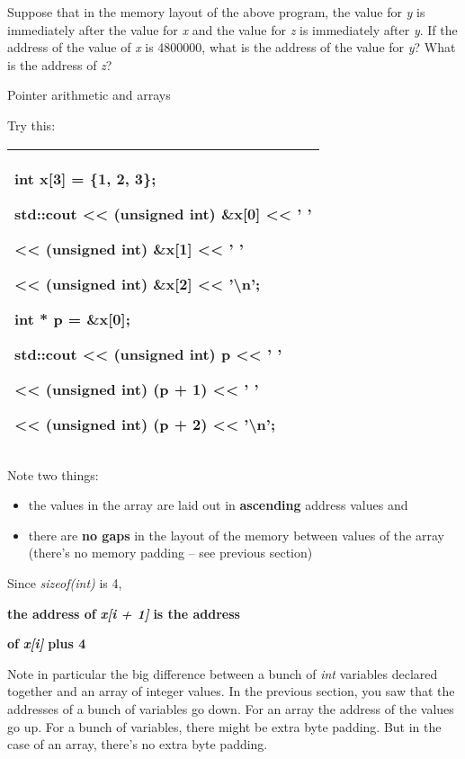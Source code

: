 \documentclass[
]{article}
\providecommand{\tightlist}{%
  \setlength{\itemsep}{0pt}\setlength{\parskip}{0pt}}
\begin{document}
Suppose that in the memory layout of the above program, the value
for\emph{ y} is immediately after the value for \emph{x} and the value
for \emph{z} is immediately after \emph{y}. If the address of the value
of \emph{x} is 4800000, what is the address of the value for \emph{y}?
What is the address of \emph{z}?

Pointer arithmetic and arrays

Try this:

\begin{longtable}[]{@{}l@{}}
\toprule
\endhead
\begin{minipage}[t]{0.97\columnwidth}\raggedright
int x{[}3{]} = \{1, 2, 3\};

std::cout \textless\textless{} (unsigned int) \&x{[}0{]}
\textless\textless{} ' '

\textless\textless{} (unsigned int) \&x{[}1{]} \textless\textless{} ' '

\textless\textless{} (unsigned int) \&x{[}2{]} \textless\textless{}
'\textbackslash n';

int * p = \&x{[}0{]};

std::cout \textless\textless{} (unsigned int) p \textless\textless{} ' '

\textless\textless{} (unsigned int) (p + 1) \textless\textless{} ' '

\textless\textless{} (unsigned int) (p + 2) \textless\textless{}
'\textbackslash n';\strut
\end{minipage}\tabularnewline
\bottomrule
\end{longtable}

Note two things:

\begin{itemize}
\tightlist
\item
  the values in the array are laid out in \textbf{ascending} address
  values and
\item
  there are \textbf{no gaps} in the layout of the memory between values
  of the array (there's no memory padding -- see previous section)
\end{itemize}

Since \emph{sizeof(int)} is 4,

\textbf{ the address of }\emph{\textbf{x{[}i }\textbf{+
1}\textbf{{]}}}\textbf{ is the address }

\textbf{ of }\emph{\textbf{x{[}i{]}}}\textbf{ plus 4}

Note in particular the big difference between a bunch of \emph{int}
variables declared together and an array of integer values. In the
previous section, you saw that the addresses of a bunch of variables go
down. For an array the address of the values go up. For a bunch of
variables, there might be extra byte padding. But in the case of an
array, there's no extra byte padding.
\end{document}
